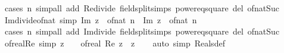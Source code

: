 \begin{isabellebody}
\isamarkupfalse%
\ {\isacharparenleft}{\kern0pt}cases\ n{\isacharparenright}{\kern0pt}\ {\isacharparenleft}{\kern0pt}simp{\isacharunderscore}{\kern0pt}all\ add{\isacharcolon}{\kern0pt}\ Re{\isacharunderscore}{\kern0pt}divide\ field{\isacharunderscore}{\kern0pt}split{\isacharunderscore}{\kern0pt}simps\ power{}{\isacharunderscore}{\kern0pt}eq{\isacharunderscore}{\kern0pt}square\ del{\isacharcolon}{\kern0pt}\ of{\isacharunderscore}{\kern0pt}nat{\isacharunderscore}{\kern0pt}Suc{\isacharparenright}{\kern0pt}%
\endisatagproof
{\isafoldproof}%
%
\isadelimproof
\isanewline
%
\endisadelimproof
\isanewline
{}\isamarkupfalse%
\ Im{\isacharunderscore}{\kern0pt}divide{\isacharunderscore}{\kern0pt}of{\isacharunderscore}{\kern0pt}nat\ {\isacharbrackleft}{\kern0pt}simp{\isacharbrackright}{\kern0pt}{\isacharcolon}{\kern0pt}\ {\isachardoublequoteopen}Im\ {\isacharparenleft}{\kern0pt}z\ {\isacharslash}{\kern0pt}\ of{\isacharunderscore}{\kern0pt}nat\ n{\isacharparenright}{\kern0pt}\ {\isacharequal}{\kern0pt}\ Im\ z\ {\isacharslash}{\kern0pt}\ of{\isacharunderscore}{\kern0pt}nat\ n{\isachardoublequoteclose}\isanewline
%
\isadelimproof
\ \ %
\endisadelimproof
%
\isatagproof
{}\isamarkupfalse%
\ {\isacharparenleft}{\kern0pt}cases\ n{\isacharparenright}{\kern0pt}\ {\isacharparenleft}{\kern0pt}simp{\isacharunderscore}{\kern0pt}all\ add{\isacharcolon}{\kern0pt}\ Im{\isacharunderscore}{\kern0pt}divide\ field{\isacharunderscore}{\kern0pt}split{\isacharunderscore}{\kern0pt}simps\ power{}{\isacharunderscore}{\kern0pt}eq{\isacharunderscore}{\kern0pt}square\ del{\isacharcolon}{\kern0pt}\ of{\isacharunderscore}{\kern0pt}nat{\isacharunderscore}{\kern0pt}Suc{\isacharparenright}{\kern0pt}%
\endisatagproof
{\isafoldproof}%
%
\isadelimproof
\isanewline
%
\endisadelimproof
\isanewline
{}\isamarkupfalse%
\ of{\isacharunderscore}{\kern0pt}real{\isacharunderscore}{\kern0pt}Re\ {\isacharbrackleft}{\kern0pt}simp{\isacharbrackright}{\kern0pt}{\isacharcolon}{\kern0pt}\ {\isachardoublequoteopen}z\ {\isasymin}\ {\isasymreal}\ {\isasymLongrightarrow}\ of{\isacharunderscore}{\kern0pt}real\ {\isacharparenleft}{\kern0pt}Re\ z{\isacharparenright}{\kern0pt}\ {\isacharequal}{\kern0pt}\ z{\isachardoublequoteclose}\isanewline
%
\isadelimproof
\ \ %
\endisadelimproof
%
\isatagproof
{}\isamarkupfalse%
\ {\isacharparenleft}{\kern0pt}auto\ simp{\isacharcolon}{\kern0pt}\ Reals{\isacharunderscore}{\kern0pt}def{\isacharparenright}{\kern0pt}%
\endisatagproof
{\isafoldproof}%
%
\isadelimproof
\isanewline
%
\endisadelimproof

\end{isabellebody}
